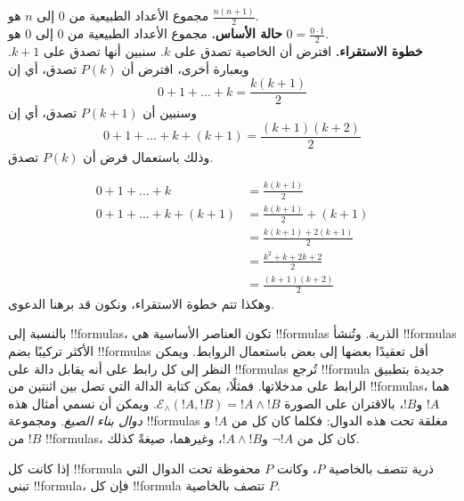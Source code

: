 \documentclass[../../../include/open-logic-section]{subfiles}
\begin{document}
\begin{ex} مجموع الأعداد الطبيعية من $0$ إلى $n$ هو $\frac{n(n+1)}{2}$. \\

\textbf{حالة الأساس.} مجموع الأعداد الطبيعية من $0$ إلى $0$ هو $0=
\frac{0\cdot 1}{2}$.\\

\textbf{خطوة الاستقراء.} افترض أن الخاصية تصدق على $k$. سنبين أنها
تصدق على $k+1$. وبعبارة أخرى، افترض أن $P(k)$ تصدق، أي إن
\[ 0 + 1 + \ldots + k = \frac{k(k+1)}{2} \]
وسنبين أن $P(k+1)$ تصدق، أي إن
\[ 0 + 1 + \ldots + k + (k+1) = \frac{(k+1)(k+2)}{2} \]
وذلك باستعمال فرض أن $P(k)$ تصدق.

\begin{align*}
0 + 1 + \ldots + k &= \frac{k(k+1)}{2} \tag{فرض الاستقراء} \\
0 + 1 + \ldots + k + (k+1) &= \frac{k(k+1)}{2} + (k+1)
\tag{إضافة $k+1$ إلى الطرفين} \\
&= \frac{k(k+1) + 2(k+1)}{2} \\
&= \frac{k^2 + k + 2k +2}{2} \\
&=\frac{(k+1)(k+2)}{2}
\end{align*}
وهكذا تتم خطوة الاستقراء، ونكون قد برهنا الدعوى.
\end{ex}

\begin{explain}
بالنسبة إلى !!{formula}s، تكون العناصر الأساسية هي !!{formula}s الذرية.
وتُنشأ !!{formula}s الأكثر تركيبًا بضم !!{formula}s أقل تعقيدًا بعضها إلى
بعض باستعمال الروابط. ويمكن النظر إلى كل رابط على أنه يقابل دالة على
!!{formula}s تُرجع !!{formula} جديدة بتطبيق الرابط على مدخلاتها. فمثلًا،
يمكن كتابة الدالة التي تصل بين اثنتين من !!{formula}s، هما $!A$ و$!B$، بالاقتران
على الصورة $\mathcal E _\land (!A, !B) = !A \land !B$. ويمكن أن نسمي
أمثال هذه \emph{دوال بناء الصيغ}. ومجموعة !!{formula}s مغلقة تحت هذه الدوال:
فكلما كان كل من $!A$ و$!B$ من !!{formula}s، كان كل من $\lnot !A$
و$!A \land !B$، وغيرهما، صيغةً كذلك.
\end{explain}

\begin{defn}
إذا كانت كل !!{formula} ذرية تتصف بالخاصية $P$، وكانت $P$ محفوظة
تحت الدوال التي تبني !!{formula}، فإن كل !!{formula} تتصف بالخاصية $P$.
\end{defn}
\end{document}
